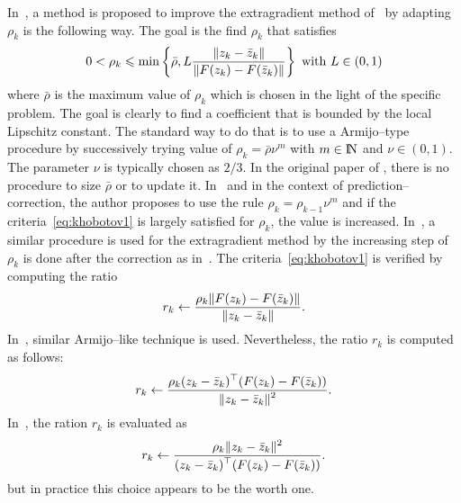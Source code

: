 In~\citep{Khobotov_CMMP1987}, a method is proposed to improve the extragradient method of~\citet{Korpelevich1976} by adapting $\rho_k$ is the following way. The goal is the find $\rho_k$ that satisfies
  \begin{equation}
    \label{eq:khobotov1}
    0 < \rho_k \leq \min\left\{\bar\rho,L \Frac{\|z_k-\bar z_k\|}{\|F(z_k)-F(\bar z_k)\|}\right\}\text{ with } L \in (0,1)
  \end{equation}
where $\bar \rho$ is the maximum value of $\rho_k$ which is chosen in the light of the specific problem.  The goal is clearly to find a coefficient that is bounded by the local Lipschitz constant. The standard way to do that is to use a Armijo--type procedure by successively trying value of $\rho_k = \bar \rho \nu^m$ with $m\in\mathrm{I\!N}$ and $\nu\in (0,1)$. The parameter $\nu$ is typically chosen as $2/3$.  In the original paper of \cite{Khobotov_CMMP1987}, there is no procedure to size $\bar \rho$ or to update it. In~\cite{He.Liao_JOTA2002} and in the context of prediction--correction, the author proposes to use the rule $\rho_k =  \rho_{k-1} \nu^m$ and  if the criteria~\eqref{eq:khobotov1} is largely satisfied for $\rho_{k}$, the value is increased.
In~\citep{Han.Lo_CMA2002},  a similar procedure is used for the extragradient method by the increasing step of $\rho_k$ is done after the correction as in~\cite{He.Liao_JOTA2002}.
 The criteria~\eqref{eq:khobotov1} is  verified by computing the ratio
\begin{equation}
  \label{eq:Khobotov-r}
  r _{k} \leftarrow \Frac{\rho_k \|F(z_k)-F(\bar z_k)\|}{ \|z_k-\bar z_k\| }.
\end{equation}
 In~\citep{Solodov.Tseng1996}, similar Armijo--like technique is used. Nevertheless, the ratio $r_k$ is computed as follows:
\begin{equation}
  \label{eq:SolodovTseng-r}
  r _{k} \leftarrow \Frac{\rho_k(z_k-\bar z_k)^\top(F(z_k)-F(\bar z_k))}{ \|z_k-\bar z_k\|^2 }.
\end{equation}
In~\cite{Han.Sun_CMA2004}, the ration $r_k$ is evaluated as
\begin{equation}
  \label{eq:HanSun-r}
  r _{k} \leftarrow \Frac{\rho_k \|z_k-\bar z_k\|^2 }{(z_k-\bar z_k)^\top(F(z_k)-F(\bar z_k))}.
\end{equation}
but in practice this choice appears to be the worth one. 


